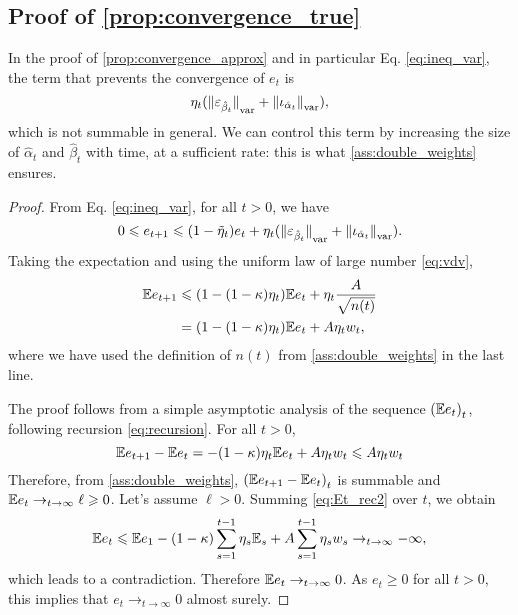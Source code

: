 \subsection{Proof of \autoref{prop:convergence_true}}\label{sec:proof_prop_convergence}

In the proof of \autoref{prop:convergence_approx} and in particular Eq. \eqref{eq:ineq_var}, the term that prevents the convergence of $e_t$ is
\begin{equation}
    \eta_t ({\Vert \varepsilon_{\hat \beta_t} \Vert}_{\text{\upshape var}} + 
    {\Vert \iota_{\hat \alpha_t} \Vert}_{\text{\upshape var}}),
\end{equation}
which is not summable in general. We can control this term by increasing the
 size of $\hat \alpha_t$ and $\hat \beta_t$ with time, at a sufficient rate: this is what \autoref{ass:double_weights} ensures.

\begin{proof}
From Eq. \eqref{eq:ineq_var}, for all $t > 0$, we have
\begin{equation}\label{eq:Et_rec}
    0 \leqslant e_{t+1} \leqslant 
    (1 - \tilde \eta_t) e_t
    + \eta_t
    ({\Vert \varepsilon_{\hat \beta_t} \Vert}_{\text{\upshape var}} + 
    {\Vert \iota_{\hat \alpha_t} \Vert}_{\text{\upshape var}}).
\end{equation}
Taking the expectation and using the uniform law of 
large number \eqref{eq:vdv},
\begin{align}\label{eq:recursion}
    \mathbb{E} e_{t+1} &\leqslant (1 - (1 - \kappa) \eta_t) \mathbb{E} e_t + 
    \eta_t \frac{A}{\sqrt{n(t)}} \\
    &= (1 - (1 - \kappa) \eta_t) \mathbb{E} e_t + 
    A \eta_t w_t,
\end{align}
where we have used the definition of $n(t)$ from \autoref{ass:double_weights} in the last line.

The proof follows from a simple asymptotic analysis of the sequence ${(\mathbb{E} e_t)}_t$, following recursion \eqref{eq:recursion}.
For all $t > 0$, 
\begin{equation}\label{eq:Et_rec2}
    \mathbb{E} e_{t+1} - \mathbb{E} e_t = - (1 - \kappa) \eta_t \mathbb{E} e_t + A \eta_t w_t
     \leqslant A \eta_t w_t
\end{equation}
Therefore, from \autoref{ass:double_weights}, ${(\mathbb{E} e_{t+1} - \mathbb{E} e_t)}_t$ is
summable and $\mathbb{E} e_t \to_{t \to \infty} \ell \geqslant 0$. Let's assume $\ell > 0$.
Summing \eqref{eq:Et_rec2} over $t$, we obtain
\begin{equation}
    \mathbb{E} e_t \leqslant \mathbb{E} e_1 - (1 - \kappa) \sum_{s=1}^{t-1} \eta_s \mathbb{E}_s 
    + A \sum_{s=1}^{t-1} \eta_s w_s \to_{t \to \infty} - \infty,
\end{equation}
which leads to a contradiction. Therefore $\mathbb{E} e_t \to_{t \to \infty} 0$. As
$e_t \geq 0$ for all $t > 0$, this implies that $e_t \to_{t \to \infty} 0$
almost surely.
\end{proof}


